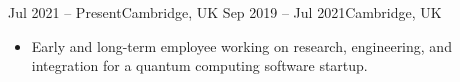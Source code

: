 \documentclass[10pt,a4paper,ragged2e,withhyper]{altacv}
\begin{document}
\begin{paracol}{2}


{Jul 2021 -- Present}{Cambridge, UK}
{Sep 2019 -- Jul 2021}{Cambridge, UK}


% 
% 
% 

% 
% 
% 
% 

% 
% 

% 

% 

\begin{itemize}
    \item Early and long-term employee working on research, engineering, and
    integration for a quantum computing software startup.


\end{itemize}
\end{paracol}
\end{document}

